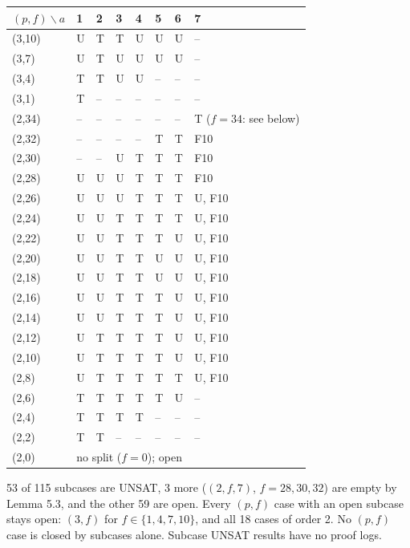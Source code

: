 \begin{center}\small
\begin{tabular}{@{}llllllll@{}}
\toprule
$(p,f) \backslash a$ & 1 & 2 & 3 & 4 & 5 & 6 & 7 \\
\midrule
(3,10) & U & T & T & U & U & U & -- \\
(3,7) & U & T & U & U & U & U & -- \\
(3,4) & T & T & U & U & -- & -- & -- \\
(3,1) & T & -- & -- & -- & -- & -- & -- \\
(2,34) & -- & -- & -- & -- & -- & -- & T ($f=34$: see below) \\
(2,32) & -- & -- & -- & -- & T & T & F10 \\
(2,30) & -- & -- & U & T & T & T & F10 \\
(2,28) & U & U & U & T & T & T & F10 \\
(2,26) & U & U & U & T & T & T & U, F10 \\
(2,24) & U & U & T & T & T & T & U, F10 \\
(2,22) & U & U & T & T & T & U & U, F10 \\
(2,20) & U & U & T & T & U & U & U, F10 \\
(2,18) & U & U & T & T & U & U & U, F10 \\
(2,16) & U & U & T & T & T & U & U, F10 \\
(2,14) & U & U & T & T & T & U & U, F10 \\
(2,12) & U & T & T & T & T & U & U, F10 \\
(2,10) & U & T & T & T & T & U & U, F10 \\
(2,8) & U & T & T & T & T & T & U, F10 \\
(2,6) & T & T & T & T & T & U & -- \\
(2,4) & T & T & T & T & -- & -- & -- \\
(2,2) & T & T & -- & -- & -- & -- & -- \\
(2,0) & \multicolumn{7}{l}{no split ($f = 0$); open} \\
\bottomrule
\end{tabular}
\end{center}

53 of 115 subcases are UNSAT, 3 more ($(2,f,7)$, $f = 28, 30, 32$) are empty by Lemma 5.3, and the other 59 are open. Every $(p, f)$ case with an open subcase stays
open: $(3, f)$ for $f \in \{1, 4, 7, 10\}$, and all 18 cases of order 2. No $(p, f)$ case is closed by subcases alone. Subcase UNSAT results have no proof logs.

